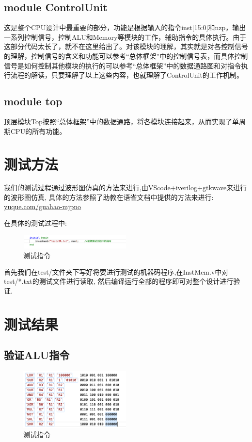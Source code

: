 \documentclass{article}
\begin{document}
\subsection{module ControlUnit}

这是整个CPU设计中最重要的部分，功能是根据输入的指令inst[15:0]和nzp，输出一系列控制信号，控制ALU和Memory等模块的工作，辅助指令的具体执行。由于这部分代码太长了，就不在这里给出了。对该模块的理解，其实就是对各控制信号的理解，控制信号的含义和功能可以参考“总体框架”中的控制信号表，而具体控制信号是如何控制其他模块的执行的可以参考“总体框架”中的数据通路图和对指令执行流程的解读，只要理解了以上这些内容，也就理解了ControlUnit的工作机制。

\subsection{module top}
顶层模块Top按照“总体框架”中的数据通路，将各模块连接起来，从而实现了单周期CPU的所有功能。


\section{测试方法}
我们的测试过程通过波形图仿真的方法来进行,由VScode+iverilog+gtkwave来进行的波形图仿真,
具体的方法参照了助教在语雀文档中提供的方法来进行:
\href{https://www.yuque.com/guahao-mjpno/bppkqw/ibdcd1}{yuque.com/guahao-mjpno} 

在具体的测试过程中:

\begin{figure}[H]
    \centering
    \includegraphics[width=0.5\textwidth]{pic/7.png}
    \caption{\label{pr}测试指令}
    \end{figure}
首先我们在test/文件夹下写好将要进行测试的机器码程序,在InstMem.v中对test/*.txt的测试文件进行读取,
然后编译运行全部的程序即可对整个设计进行验证.


\section{测试结果}

\subsection{验证ALU指令}

\begin{figure}[H]
    \centering
    \includegraphics[width=0.5\textwidth]{pic/3.png}
    \caption{\label{pr}测试指令}
    \end{figure}
        
\end{document}

